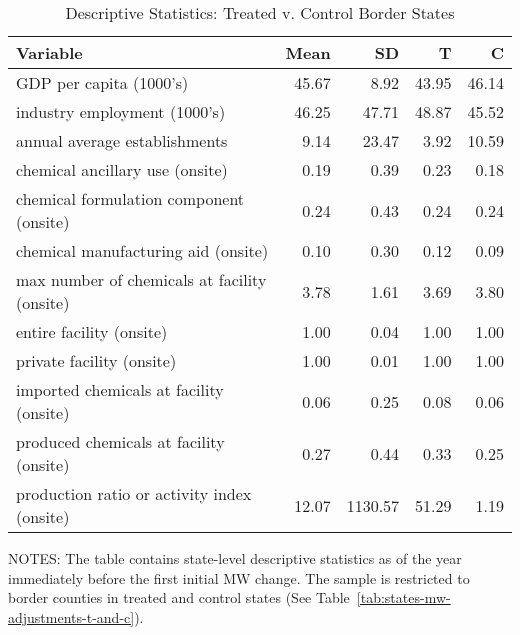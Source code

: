 \begin{table}[H]
    \centering
    \caption{Descriptive Statistics: Treated v. Control Border States}
    \label{tab:descriptive-statistics-control-border-states}
    \begin{tabular}{lrrrr}
        \toprule \toprule
        Variable                                     & Mean  & SD      & T     & C     \\ \midrule\midrule
        GDP per capita (1000's)                      & 45.67 & 8.92    & 43.95 & 46.14 \\
        industry employment (1000's)                 & 46.25 & 47.71   & 48.87 & 45.52 \\
        annual average establishments                & 9.14  & 23.47   & 3.92  & 10.59 \\
        chemical ancillary use (onsite)              & 0.19  & 0.39    & 0.23  & 0.18  \\
        chemical formulation component (onsite)      & 0.24  & 0.43    & 0.24  & 0.24  \\
        chemical manufacturing aid (onsite)          & 0.10  & 0.30    & 0.12  & 0.09  \\
        max number of chemicals at facility (onsite) & 3.78  & 1.61    & 3.69  & 3.80  \\
        entire facility (onsite)                     & 1.00  & 0.04    & 1.00  & 1.00  \\
        private facility (onsite)                    & 1.00  & 0.01    & 1.00  & 1.00  \\
        imported chemicals at facility (onsite)      & 0.06  & 0.25    & 0.08  & 0.06  \\
        produced chemicals at facility (onsite)      & 0.27  & 0.44    & 0.33  & 0.25  \\
        production ratio or activity index (onsite)  & 12.07 & 1130.57 & 51.29 & 1.19  \\ \bottomrule\bottomrule
    \end{tabular}
    \begin{minipage}{13.5cm}
        \vspace{0.05in}
        \tiny NOTES: The table contains state-level descriptive statistics as of the year immediately before the first initial MW change. The sample is restricted to border counties in treated and control states (See Table~\ref{tab:states-mw-adjustments-t-and-c}).
    \end{minipage}
\end{table}

